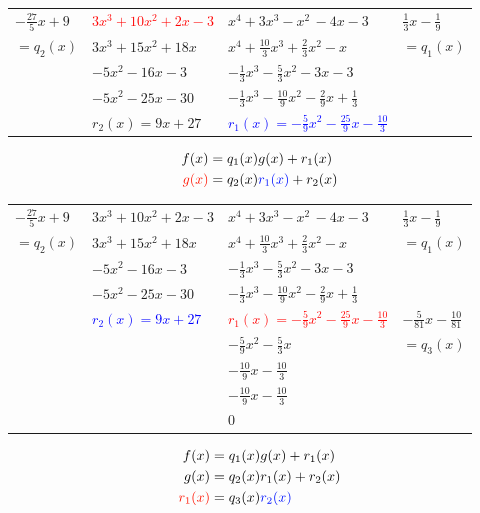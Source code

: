 \documentclass[13pt,fontset=mac]{ctexbeamer}
\newcommand{\blue}{\textcolor{blue}}
\newcommand{\red}{\textcolor{red}}
\begin{document}
\begin{frame}
	\begin{center}
				\renewcommand\arraystretch{1.3}
		\begin{tabular}{R{1.5cm}|R{3cm} |R{4cm}|L{1.7cm}}
$-\frac{27}{5}x+9$ &\red{$3x^3+10x^2+2x-3$}&{$x^4+3x^3-x^2\, -4x-3$}&$\frac{1}{3}x-\frac{1}{9}$\\
$=q_2(x)$ & $3x^3+15x^2+18x\quad $ & $x^4+\frac{10}{3}x^3+\frac{2}{3}x^2-x\qquad $& $=q_1(x)$\\
 &$ -5x^2-16x-3$ & $-\frac{1}{3}x^3-\frac{5}{3}x^2-3x-3\, $ & \\
  &$ -5x^2-25x-30$ & $-\frac{1}{3}x^3-\frac{10}{9}x^2-\frac{2}{9}x+\frac{1}{3}$ & \\
  &$ r_2(x) = 9x+27$ & \blue{$r_1(x) =-\frac{5}{9}x^2-\frac{25}{9}x-\frac{10}{3}$} &
		\end{tabular}
	\end{center}
	\pause

\begin{align*}
	{f(x)} & =q_1(x) {g(x)} +r_1(x)\\
\red{g(x)} & =q_2(x) \blue{r_1(x)} +r_2(x)
\end{align*}

\end{frame}




\begin{frame}
	\begin{center}
				\renewcommand\arraystretch{1.2}
		\begin{tabular}{R{1.5cm}|R{3cm} |R{4cm}|L{1.7cm}}
			$-\frac{27}{5}x+9$  & {$3x^3+10x^2+2x-3$}  &
             {$x^4+3x^3-x^2\, -4x-3$}&$\frac{1}{3}x-\frac{1}{9}$\\
			$=q_2(x)$ & $3x^3+15x^2+18x\quad $ & $x^4+\frac{10}{3}x^3+\frac{2}{3}x^2-x\qquad $& $=q_1(x)$\\
			&$ -5x^2-16x-3$ & $-\frac{1}{3}x^3-\frac{5}{3}x^2-3x-3\, $ & \\
			&$ -5x^2-25x-30$ & $-\frac{1}{3}x^3-\frac{10}{9}x^2-\frac{2}{9}x+\frac{1}{3}$ & \\
			&\blue{$r_2(x) = 9x+27$} & \red{$r_1(x) =-\frac{5}{9}x^2-\frac{25}{9}x-\frac{10}{3}$} & $-\frac{5}{81}x-\frac{10}{81}$\\
			& & $-\frac{5}{9}x^2-\frac{5}{3}x$ & $=q_3(x)$\\
			& & $-\frac{10}{9}x-\frac{10}{3}$ & \\
			& & $-\frac{10}{9}x-\frac{10}{3}$ & \\
			& & 0 & \\
		\end{tabular}
	\end{center}

	\begin{align*}
		{f(x)} & =q_1(x) {g(x)} +r_1(x)\\
		{g(x)} & =q_2(x) {r_1(x)} +r_2(x)\\
		\red{r_1(x)} & = q_3(x) \blue{r_2(x)}
	\end{align*}



\end{frame}
\end{document}
